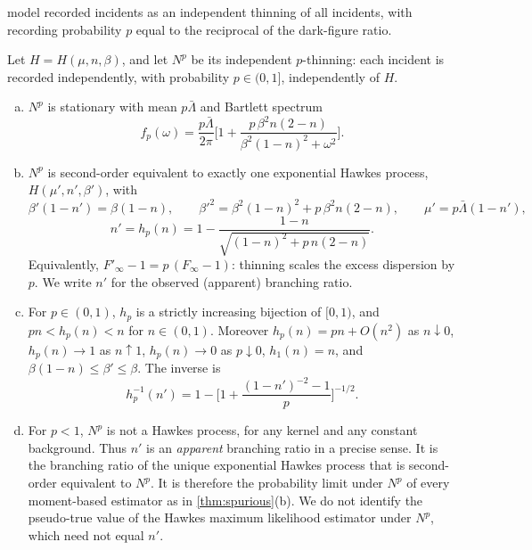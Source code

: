  model recorded incidents as an independent thinning of all incidents, with
recording probability $p$ equal to the reciprocal of the dark-figure ratio.

\begin{theorem}\label{thm:thinning}
Let $H=H(\mu,n,\beta)$, and let $N^p$ be its independent $p$-thinning: each incident
is recorded independently, with probability $p\in(0,1]$, independently of $H$.
\begin{enumerate}[(a)]
  \item $N^p$ is stationary with mean $p\bar\Lambda$ and Bartlett spectrum
  \[
  f_p(\omega)=\frac{p\bar\Lambda}{2\pi}\Big[1+\frac{p\,\beta^2 n(2-n)}{\beta^2(1-n)^2+\omega^2}\Big].
  \]
  \item $N^p$ is second-order equivalent to exactly one exponential Hawkes process,
  $H(\mu',n',\beta')$, with
  \[
  \beta'(1-n')=\beta(1-n),\qquad \beta'^2=\beta^2(1-n)^2+p\,\beta^2n(2-n),\qquad
  \mu'=p\bar\Lambda(1-n'),
  \]
  \begin{equation}\label{eq:th-hp}
    n'=h_p(n)=1-\frac{1-n}{\sqrt{(1-n)^2+p\,n(2-n)}} .
  \end{equation}
  Equivalently, $F'_\infty-1=p\,(F_\infty-1)$: thinning scales the excess dispersion by
  $p$. We write $n'$ for the observed (apparent) branching ratio.
  \item For $p\in(0,1)$, $h_p$ is a strictly increasing bijection of $[0,1)$, and
  $pn<h_p(n)<n$ for $n\in(0,1)$. Moreover $h_p(n)=pn+O(n^2)$ as $n\downarrow0$,
  $h_p(n)\to1$ as $n\uparrow1$, $h_p(n)\to0$ as $p\downarrow0$, $h_1(n)=n$, and
  $\beta(1-n)\le\beta'\le\beta$. The inverse is
  \begin{equation}\label{eq:th-hinv}
    h_p^{-1}(n')=1-\Big[1+\frac{(1-n')^{-2}-1}{p}\Big]^{-1/2}.
  \end{equation}
  \item For $p<1$, $N^p$ is not a Hawkes process, for any kernel and any constant
  background. Thus $n'$ is an \emph{apparent} branching ratio in a precise sense. It is
  the branching ratio of the unique exponential Hawkes process that is second-order
  equivalent to $N^p$. It is therefore the probability limit under $N^p$ of every
  moment-based estimator as in \cref{thm:spurious}(b). We do not identify the
  pseudo-true value of the Hawkes maximum likelihood estimator under $N^p$, which
  need not equal $n'$.
\end{enumerate}
\end{theorem}

